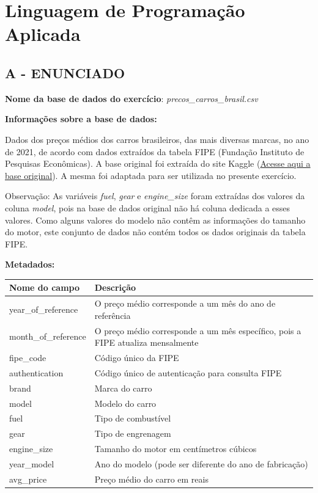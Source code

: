 \label{ap:ap02}
\chapter{Linguagem de Programação Aplicada}

\section*{\textbf{A - ENUNCIADO}}
\textbf{Nome da base de dados do exercício}: \textit{precos\_carros\_brasil.csv}

\textbf{Informações sobre a base de dados: }

Dados dos preços médios dos carros brasileiros, das mais diversas marcas, no ano de 2021, de acordo com dados extraídos
da tabela FIPE (Fundação Instituto de Pesquisas Econômicas). A base original foi extraída do site Kaggle
(\href{https://www.kaggle.com/datasets/vagnerbessa/average-car-prices-bazil/data}{\textcolor[HTML]{1155CC}{Acesse aqui
a base original}}). A mesma foi adaptada para ser utilizada no presente exercício.

Observação: As variáveis \textit{fuel\hspace{0pt}\hspace{0pt}}, \textit{gear} e \textit{engine\_size} foram extraídas
dos valores da coluna \textit{model}, pois na base de dados original não há coluna dedicada a esses valores. Como
alguns valores do modelo não contêm as informações do tamanho do motor, este conjunto de dados não contém todos os
dados originais da tabela FIPE.

\textbf{Metadados:}
\begin{center}
\begin{tabular}{|p{}|p{}|}
\hline
\textbf{Nome do campo} & \textbf{Descrição} \\
\hline
year\_of\_reference & O preço médio corresponde a um mês do ano de referência \\
\hline
month\_of\_reference & O preço médio corresponde a um mês específico, pois a FIPE atualiza mensalmente \\
\hline
fipe\_code & Código único da FIPE \\
\hline
authentication & Código único de autenticação para consulta FIPE \\
\hline
brand & Marca do carro \\
\hline
model & Modelo do carro \\
\hline
fuel & Tipo de combustível \\
\hline
gear & Tipo de engrenagem \\
\hline
engine\_size & Tamanho do motor em centímetros cúbicos \\
\hline
year\_model & Ano do modelo (pode ser diferente do ano de fabricação) \\
\hline
avg\_price & Preço médio do carro em reais \\
\hline
\end{tabular}
\end{center}



